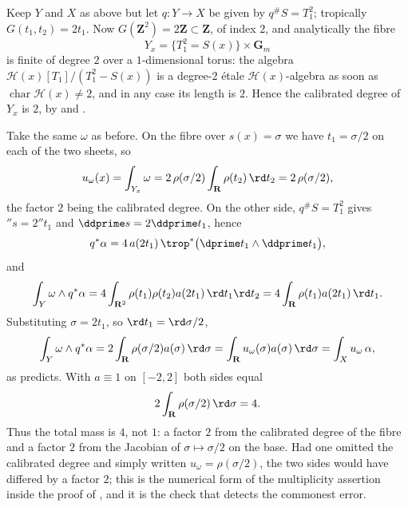 \begin{example}
\label{ex:ch14-fibre-degree-numbers}
Keep $Y$ and $X$ as above but let $q:Y\to X$ be given by
$q^\#S=T_1^2$; tropically $G(t_1,t_2)=2t_1$.  Now
$G(\mathbf Z^2)=2\mathbf Z\subset\mathbf Z$, of index $2$, and analytically
the fibre
\[
 Y_x=\{T_1^2=S(x)\}\times\mathbf G_m
\]
is finite of degree $2$ over a $1$-dimensional torus: the algebra
$\mathcal H(x)[T_1]/(T_1^2-S(x))$ is a degree-$2$ \'etale
$\mathcal H(x)$-algebra as soon as $\operatorname{char}\mathcal H(x)\neq2$,
and in any case its length is $2$.  Hence the calibrated degree of $Y_x$ is
$2$, by  and .

Take the same $\omega$ as before.  On the fibre over $s(x)=\sigma$ we have
$t_1=\sigma/2$ on each of the two sheets, so
\[
 u_\omega(x)=\int_{Y_x}\omega
 =2\,\rho(\sigma/2)\int_{\mathbf R}\rho(t_2)\,\rd t_2
 =2\,\rho(\sigma/2),
\]
the factor $2$ being the calibrated degree.  On the other side,
$q^\#S=T_1^2$ gives $\dprime s=2\dprime t_1$ and $\ddprime s=2\ddprime t_1$,
hence
\[
 q^*\alpha=4\,a(2t_1)\,\trop^*\bigl(\dprime t_1\wedge\ddprime t_1\bigr),
\]
and
\[
 \int_Y\omega\wedge q^*\alpha
 =4\int_{\mathbf R^2}\rho(t_1)\rho(t_2)a(2t_1)\,\rd t_1\rd t_2
 =4\int_{\mathbf R}\rho(t_1)a(2t_1)\,\rd t_1 .
\]
Substituting $\sigma=2t_1$, so $\rd t_1=\rd\sigma/2$,
\[
 \int_Y\omega\wedge q^*\alpha
 =2\int_{\mathbf R}\rho(\sigma/2)a(\sigma)\,\rd\sigma
 =\int_{\mathbf R}u_\omega(\sigma)a(\sigma)\,\rd\sigma
 =\int_Xu_\omega\,\alpha,
\]
as  predicts.  With $a\equiv1$ on
$[-2,2]$ both sides equal
\[
 2\int_{\mathbf R}\rho(\sigma/2)\,\rd\sigma=4 .
\]
Thus the total mass is $4$, not $1$: a factor $2$ from the calibrated degree
of the fibre and a factor $2$ from the Jacobian of $\sigma\mapsto\sigma/2$ on
the base.  Had one omitted the calibrated degree and simply written
$u_\omega=\rho(\sigma/2)$, the two sides would have differed by a factor
$2$; this is the numerical form of the multiplicity assertion inside the
proof of , and it is the check that detects
the commonest error.
\end{example}

